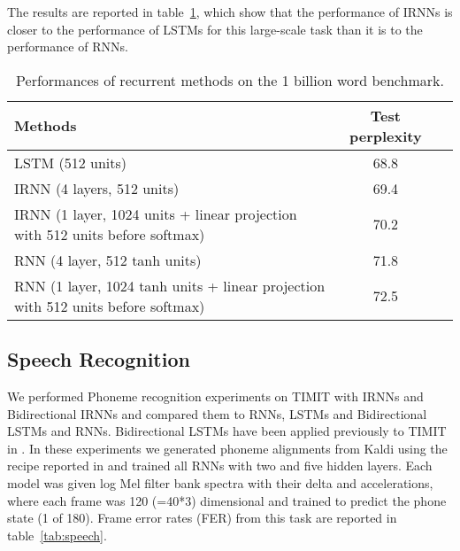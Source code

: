 \documentclass{article} \usepackage{nips14submit_e,times,graphicx}
\begin{document}
The results are reported in table~\ref{tab:1b}, which show that the
performance of IRNNs is closer to the performance of LSTMs for this
large-scale task than it is to the performance of RNNs.


\begin{table}[h!]
\centering
\begin{tabular}{|l|c|c|}
\hline
{\bf Methods}         &  {\bf Test perplexity} \\\hline \hline
LSTM (512 units)   &  68.8            \\
IRNN (4 layers, 512 units)   &  69.4            \\
IRNN (1 layer, 1024 units + linear projection with 512 units before softmax)  &  70.2            \\
RNN (4 layer, 512 tanh units)  &  71.8            \\
RNN (1 layer, 1024 tanh units + linear projection with 512 units before softmax)  &  72.5            \\\hline \end{tabular}
\caption{Performances of recurrent methods on the 1 billion word
  benchmark.}
\label{tab:1b}
\end{table}

\subsection{Speech Recognition}
We performed Phoneme recognition experiments on TIMIT with IRNNs and
Bidirectional IRNNs and compared them to RNNs, LSTMs and Bidirectional
LSTMs and RNNs. Bidirectional LSTMs have been applied previously to TIMIT
in \cite{graves2013hybrid}. In these experiments we generated phoneme
alignments from Kaldi \cite{Kaldi} using the recipe reported in
\cite{jaitly2014exploring} and trained all RNNs with two and five
hidden layers. Each model was given log Mel filter bank spectra with
their delta and accelerations, where each frame was 120 (=40*3)
dimensional and trained to predict the phone state (1 of 180). Frame
error rates (FER) from this task are reported in
table~\ref{tab:speech}.
\end{document}
